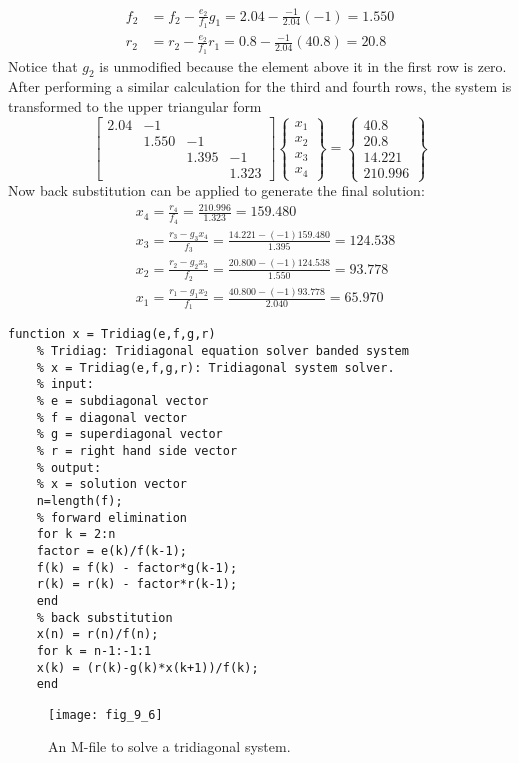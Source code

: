 \documentclass[../main.tex]{subfiles}
\begin{document}
\begin{example}
    $$
    \begin{aligned}
    f_{2} &=f_{2}-\frac{e_{2}}{f_{1}} g_{1}=2.04-\frac{-1}{2.04}(-1)=1.550 \\
    r_{2} &=r_{2}-\frac{e_{2}}{f_{1}} r_{1}=0.8-\frac{-1}{2.04}(40.8)=20.8
    \end{aligned}
    $$
    Notice that $g_{2}$ is unmodified because the element above it in the first row is zero.
    After performing a similar calculation for the third and fourth rows, the system is transformed to the upper triangular form
    $$
    \left[\begin{array}{cccc}
    2.04 & -1 & & \\
    & 1.550 & -1 & \\
    & & 1.395 & -1 \\
    & & & 1.323
    \end{array}\right]\left\{\begin{array}{l}
    x_{1} \\
    x_{2} \\
    x_{3} \\
    x_{4}
    \end{array}\right\}=\left\{\begin{array}{c}
    40.8 \\
    20.8 \\
    14.221 \\
    210.996
    \end{array}\right\}
    $$
    Now back substitution can be applied to generate the final solution:
    $$
    \begin{aligned}
    &x_{4}=\frac{r_{4}}{f_{4}}=\frac{210.996}{1.323}=159.480 \\
    &x_{3}=\frac{r_{3}-g_{3} x_{4}}{f_{3}}=\frac{14.221-(-1) 159.480}{1.395}=124.538 \\
    &x_{2}=\frac{r_{2}-g_{2} x_{3}}{f_{2}}=\frac{20.800-(-1) 124.538}{1.550}=93.778 \\
    &x_{1}=\frac{r_{1}-g_{1} x_{2}}{f_{1}}=\frac{40.800-(-1) 93.778}{2.040}=65.970
    \end{aligned}
    $$

\end{example}

\begin{lstlisting}[numbers=none,frame=none]
    function x = Tridiag(e,f,g,r)
    % Tridiag: Tridiagonal equation solver banded system
    % x = Tridiag(e,f,g,r): Tridiagonal system solver.
    % input:
    % e = subdiagonal vector
    % f = diagonal vector
    % g = superdiagonal vector
    % r = right hand side vector
    % output:
    % x = solution vector
    n=length(f);
    % forward elimination
    for k = 2:n
    factor = e(k)/f(k-1);
    f(k) = f(k) - factor*g(k-1);
    r(k) = r(k) - factor*r(k-1);
    end
    % back substitution
    x(n) = r(n)/f(n);
    for k = n-1:-1:1
    x(k) = (r(k)-g(k)*x(k+1))/f(k);
    end
\end{lstlisting}
\begin{figure}[H]
    \centering
    \texttt{[image: fig\_9\_6]}
    \caption{\textsf{An M-file to solve a tridiagonal system.}}
    \label{fig:fig_9_6}
\end{figure}
\end{document}
